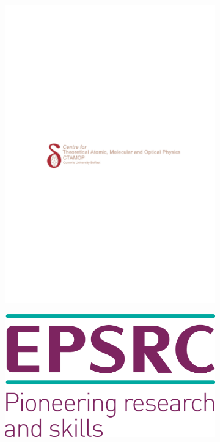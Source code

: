 \documentclass{fancyslides}
\begin{document}
\begin{frame}
\begin{figure}
\begin{minipage}[t]{.4\textwidth}
\vspace{-0.1in}




\begin{subfigure}{.9\textwidth}
 \centering
\includegraphics[width=0.8\linewidth]{ctamop.pdf}%
    \end{subfigure}
\vspace{0.1in}
\begin{subfigure}{.9\textwidth}
 \centering
\includegraphics[width=0.7\linewidth]{epsrc.png}
    \end{subfigure}

\end{minipage}



\end{figure}
\end{frame}
\end{document}
